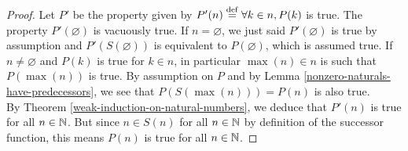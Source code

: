 \begin{proof}
    Let $P'$ be the property given by $P'(n) \overset{\mathrm{def}}{=} \forall k \in n, P(k)$ is true. The property $P'(\varnothing)$ is vacuously true. If $n = \varnothing$, we just said $P'(\varnothing)$ is true by assumption and $P'(S(\varnothing))$ is equivalent to $P(\varnothing)$, which is assumed true. If $n \neq \varnothing$ and $P(k)$ is true for $k \in n$, in particular $\max{(n)} \in n$ is such that $P(\max{(n)})$ is true. By assumption on $P$ and by Lemma \autoref{nonzero-naturals-have-predecessors}, we see that $P(S(\max{(n)})) = P(n)$ is also true.
    \\

    By Theorem \autoref{weak-induction-on-natural-numbers}, we deduce that $P'(n)$ is true for all $n \in \operatorname{\mathbb N}$. But since $n \in S(n)$ for all $n \in \operatorname{\mathbb N}$ by definition of the successor function, this means $P(n)$ is true for all $n \in \operatorname{\mathbb N}$. 
\end{proof}
